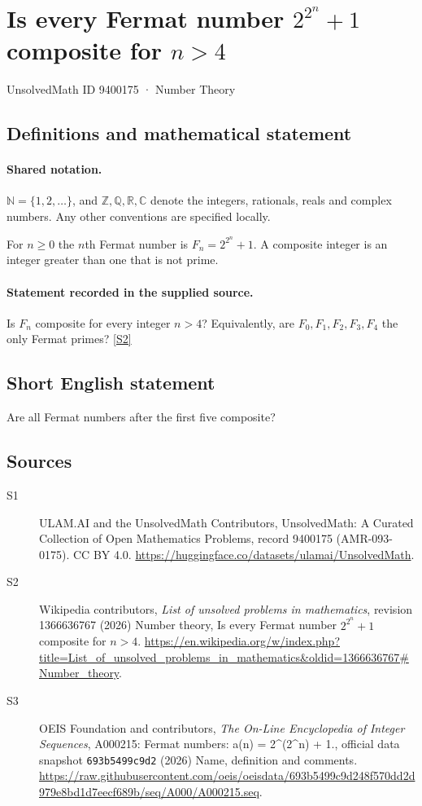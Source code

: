 \documentclass[11pt]{article}
\newcommand{\sref}[2]{\hyperlink{source:#1:#2}{[S#2]}}
\begin{document}
\setcounter{section}{9400174}
\section{Is every Fermat number $2^{2^n} + 1$ composite for $n > 4$}\label{9400175}
{\small\sffamily UnsolvedMath ID 9400175 · Number Theory}
\subsection{Definitions and mathematical statement}

\paragraph{Shared notation.}$\mathbb N=\{1,2,\ldots\}$, and $\mathbb Z,\mathbb Q,\mathbb R,\mathbb C$ denote the integers, rationals, reals and complex numbers. Any other conventions are specified locally.


For $n\ge0$ the $n$th Fermat number is $F_n=2^{2^n}+1$. A composite integer is an integer greater than one that is not prime.
\paragraph{Statement recorded in the supplied source.}
Is $F_n$ composite for every integer $n>4$? Equivalently, are $F_0,F_1,F_2,F_3,F_4$ the only Fermat primes? \sref{9400175}{2}
\subsection{Short English statement}
Are all Fermat numbers after the first five composite?
\subsection{Sources}
\begin{description}
\item[\hypertarget{source:9400175:1}{S1}] ULAM.AI and the UnsolvedMath Contributors, UnsolvedMath: A Curated Collection of Open Mathematics Problems, record 9400175 (AMR-093-0175). CC BY 4.0. \url{https://huggingface.co/datasets/ulamai/UnsolvedMath}.
\item[\hypertarget{source:9400175:2}{S2}] Wikipedia contributors, \emph{List of unsolved problems in mathematics}, revision 1366636767 (2026) Number theory, Is every Fermat number $2^{2^n} + 1$ composite for $n > 4$. \url{https://en.wikipedia.org/w/index.php?title=List_of_unsolved_problems_in_mathematics&oldid=1366636767#Number_theory}.
\item[\hypertarget{source:9400175:3}{S3}] OEIS Foundation and contributors, \emph{The On-Line Encyclopedia of Integer Sequences}, A000215: Fermat numbers: a(n) = 2\textasciicircum{}(2\textasciicircum{}n) + 1., official data snapshot \texttt{693b5499c9d2} (2026) Name, definition and comments. \url{https://raw.githubusercontent.com/oeis/oeisdata/693b5499c9d248f570dd2d979e8bd1d7eecf689b/seq/A000/A000215.seq}.
\end{description}
\label{end:9400175}
\end{document}
